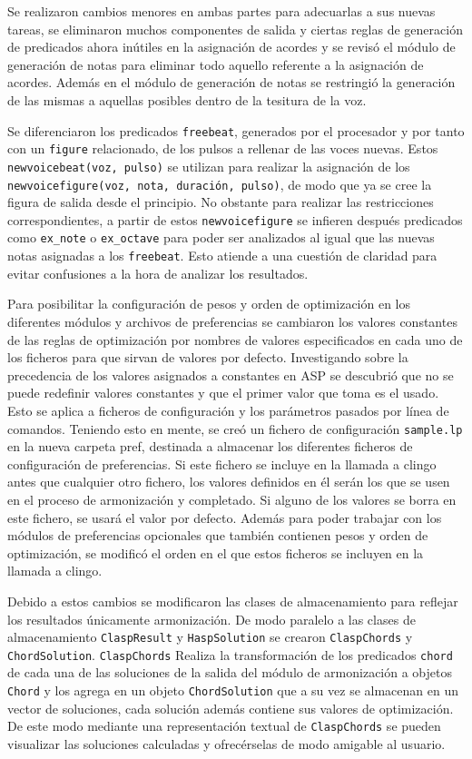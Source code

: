 Se realizaron cambios menores en ambas partes para adecuarlas a sus nuevas tareas, se eliminaron muchos componentes de salida y ciertas reglas de generación de predicados ahora inútiles en la asignación de acordes y se revisó el módulo de generación de notas para eliminar todo aquello referente a la asignación de acordes. Además en el módulo de generación de notas se restringió la generación de las mismas a aquellas posibles dentro de la tesitura de la voz.

Se diferenciaron los predicados \texttt{freebeat}, generados por el procesador y por tanto con un \texttt{figure} relacionado, de los pulsos a rellenar de las voces nuevas. Estos \texttt{newvoicebeat(voz, pulso)} se utilizan para realizar la asignación de los \texttt{newvoicefigure(voz, nota, duración, pulso)}, de modo que ya se cree la figura de salida desde el principio. No obstante para realizar las restricciones correspondientes, a partir de estos \texttt{newvoicefigure} se infieren después predicados como \texttt{ex\_note} o \texttt{ex\_octave} para poder ser analizados al igual que las nuevas notas asignadas a los \texttt{freebeat}. Esto atiende a una cuestión de claridad para evitar confusiones a la hora de analizar los resultados.
	
Para posibilitar la configuración de pesos y orden de optimización en los diferentes módulos y archivos de preferencias se cambiaron los valores constantes de las reglas de optimización por nombres de valores especificados en cada uno de los ficheros para que sirvan de valores por defecto. Investigando sobre la precedencia de los valores asignados a constantes en ASP se descubrió que no se puede redefinir valores constantes y que el primer valor que toma es el usado. Esto se aplica a ficheros de configuración y los parámetros pasados por línea de comandos. Teniendo esto en mente, se creó un fichero de configuración \texttt{sample.lp} en la nueva carpeta pref, destinada a almacenar los diferentes ficheros de configuración de preferencias. Si este fichero se incluye en la llamada a clingo antes que cualquier otro fichero, los valores definidos en él serán los que se usen en el proceso de armonización y completado. Si alguno de los valores se borra en este fichero, se usará el valor por defecto. Además para poder trabajar con los módulos de preferencias opcionales que también contienen pesos y orden de optimización, se modificó el orden en el que estos ficheros se incluyen en la llamada a clingo.

Debido a estos cambios se modificaron las clases de almacenamiento para reflejar los resultados únicamente armonización. De modo paralelo a las clases de almacenamiento \texttt{ClaspResult} y \texttt{HaspSolution} se crearon \texttt{ClaspChords} y \texttt{ChordSolution}. \texttt{ClaspChords} Realiza la transformación de los predicados \texttt{chord} de cada una de las soluciones de la salida del módulo de armonización a objetos \texttt{Chord} y los agrega en un objeto \texttt{ChordSolution} que a su vez se almacenan en un vector de soluciones, cada solución además contiene sus valores de optimización. De este modo mediante una representación textual de \texttt{ClaspChords} se pueden visualizar las soluciones calculadas y ofrecérselas de modo amigable al usuario.

